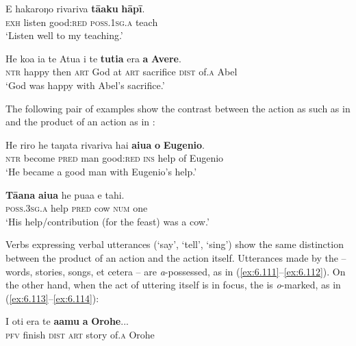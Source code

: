 \ea\label{ex:6.107}
\gll E hakaroŋo rivariva \textbf{tā{\ꞌ}aku} \textbf{hāpī}. \\
\textsc{exh} listen good:\textsc{red} \textsc{poss.1sg.a} teach \\

\glt 
‘Listen well to my teaching.’ \textstyleExampleref{[Luke 8:18]}
\z

\ea\label{ex:6.108}
\gll He koa ia te {\ꞌ}Atua {\ꞌ}i te \textbf{tutia} era \textbf{{\ꞌ}a} \textbf{{\ꞌ}Avere}. \\
\textsc{ntr} happy then \textsc{art} God at \textsc{art} sacrifice \textsc{dist} of\textsc{.a} Abel \\

\glt
‘God was happy with Abel’s sacrifice.’ \textstyleExampleref{[Gen. 4:4]}
\z

The following pair of examples show the contrast between the action as such as in  and the product of an action as in :

\ea\label{ex:6.109}
\gll He riro he taŋata rivariva hai \textbf{{\ꞌ}aiua} \textbf{o} \textbf{Eugenio}. \\
\textsc{ntr} become \textsc{pred} man good:\textsc{red} \textsc{ins} help of Eugenio \\

\glt 
‘He became a good man with Eugenio’s help.’ \textstyleExampleref{[R231.316]} 
\z

\ea\label{ex:6.110}
\gll \textbf{Tā{\ꞌ}ana} \textbf{{\ꞌ}aiua} he pua{\ꞌ}a e tahi. \\
\textsc{poss.3sg.a} help \textsc{pred} cow \textsc{num} one \\

\glt
‘His help/contribution (for the feast) was a cow.’ \textstyleExampleref{[Notes]}
\z

Verbs expressing verbal utterances (‘say’, ‘tell’, ‘sing’) show the same distinction between the product of an action and the action itself. Utterances made by the  – words, stories, songs, et cetera – are \textit{a}{}-possessed, as in (\ref{ex:6.111}–\ref{ex:6.112}). On the other hand, when the act of uttering itself is in focus, the  is \textit{o}{}-marked, as in (\ref{ex:6.113}–\ref{ex:6.114}):

\ea\label{ex:6.111}
\gll I oti era te \textbf{{\ꞌ}a{\ꞌ}amu} \textbf{{\ꞌ}a} \textbf{{\ꞌ}Orohe}... \\
\textsc{pfv} finish \textsc{dist} \textsc{art} story of\textsc{.a} Orohe \\

